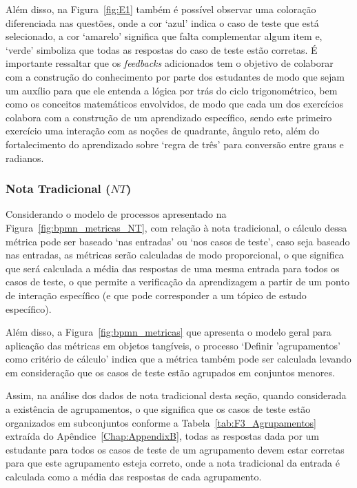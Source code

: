 Além disso, na Figura~\ref{fig:E1} também é possível observar uma coloração diferenciada nas questões, onde a cor `azul' indica o caso de teste que está selecionado, a cor `amarelo' significa que falta complementar algum item e, `verde' simboliza que todas as respostas do caso de teste estão corretas. É importante ressaltar que os \textit{feedbacks} adicionados tem o objetivo de colaborar com a construção do conhecimento por parte dos estudantes de modo que sejam um auxílio para que ele entenda a lógica por trás do ciclo trigonométrico, bem como os conceitos matemáticos envolvidos, de modo que cada um dos exercícios colabora com a construção de um aprendizado específico, sendo este primeiro exercício uma interação com as noções de quadrante, ângulo reto, além do fortalecimento do aprendizado sobre `regra de três' para conversão entre graus e radianos.

\subsubsection*{Nota Tradicional ($NT$)}
Considerando o modelo de processos apresentado na Figura~\ref{fig:bpmn_metricas_NT}, com relação à nota tradicional, o cálculo dessa métrica pode ser baseado `nas entradas' ou `nos casos de teste', caso seja baseado nas entradas, as métricas serão calculadas de modo proporcional, o que significa que será calculada a média das respostas de uma mesma entrada para todos os casos de teste, o que permite a verificação da aprendizagem a partir de um ponto de interação específico (e que pode corresponder a um tópico de estudo específico). 

Além disso, a Figura~\ref{fig:bpmn_metricas} que apresenta o modelo geral para aplicação das métricas em objetos tangíveis, o processo `Definir 'agrupamentos' como critério de cálculo' indica que a métrica também pode ser calculada levando em consideração que os casos de teste estão agrupados em conjuntos menores.

Assim, na análise dos dados de nota tradicional desta seção, quando considerada a existência de agrupamentos, o que significa que os casos de teste estão organizados em subconjuntos conforme a Tabela~\ref{tab:F3_Agrupamentos} extraída do Apêndice~\ref{Chap:AppendixB}, todas as respostas dada por um estudante para todos os casos de teste de um agrupamento devem estar corretas para que este agrupamento esteja correto, onde a nota tradicional da entrada é calculada como a média das respostas de cada agrupamento.


